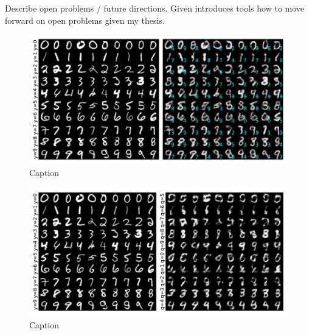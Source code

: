 

Describe open problems / future directions. 
Given introduces tools how to move forward on open problems given my thesis. 





\begin{figure}
    \centering
    \includegraphics[width=\textwidth]{graphics/image_optimization.pdf}
    \caption{Caption}
    \label{fig:my_label}
\end{figure}
\begin{figure}
    \centering
    \includegraphics[width=\textwidth]{graphics/decoder_optimization.pdf}
    \caption{Caption}
    \label{fig:my_label}
\end{figure}